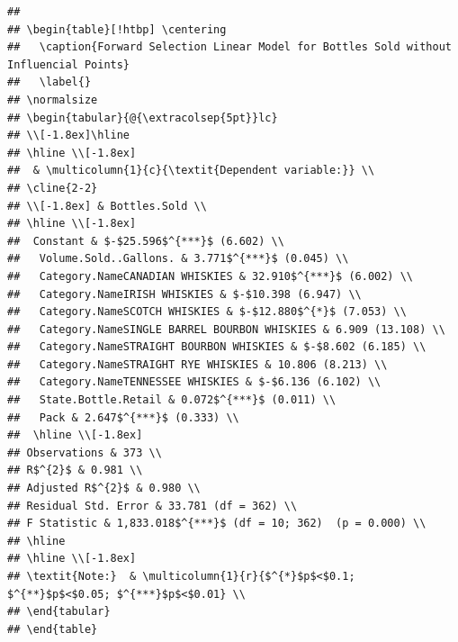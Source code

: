 \documentclass[]{elsarticle} %
\begin{document}
\begin{verbatim}
## 
## \begin{table}[!htbp] \centering 
##   \caption{Forward Selection Linear Model for Bottles Sold without Influencial Points} 
##   \label{} 
## \normalsize 
## \begin{tabular}{@{\extracolsep{5pt}}lc} 
## \\[-1.8ex]\hline 
## \hline \\[-1.8ex] 
##  & \multicolumn{1}{c}{\textit{Dependent variable:}} \\ 
## \cline{2-2} 
## \\[-1.8ex] & Bottles.Sold \\ 
## \hline \\[-1.8ex] 
##  Constant & $-$25.596$^{***}$ (6.602) \\ 
##   Volume.Sold..Gallons. & 3.771$^{***}$ (0.045) \\ 
##   Category.NameCANADIAN WHISKIES & 32.910$^{***}$ (6.002) \\ 
##   Category.NameIRISH WHISKIES & $-$10.398 (6.947) \\ 
##   Category.NameSCOTCH WHISKIES & $-$12.880$^{*}$ (7.053) \\ 
##   Category.NameSINGLE BARREL BOURBON WHISKIES & 6.909 (13.108) \\ 
##   Category.NameSTRAIGHT BOURBON WHISKIES & $-$8.602 (6.185) \\ 
##   Category.NameSTRAIGHT RYE WHISKIES & 10.806 (8.213) \\ 
##   Category.NameTENNESSEE WHISKIES & $-$6.136 (6.102) \\ 
##   State.Bottle.Retail & 0.072$^{***}$ (0.011) \\ 
##   Pack & 2.647$^{***}$ (0.333) \\ 
##  \hline \\[-1.8ex] 
## Observations & 373 \\ 
## R$^{2}$ & 0.981 \\ 
## Adjusted R$^{2}$ & 0.980 \\ 
## Residual Std. Error & 33.781 (df = 362) \\ 
## F Statistic & 1,833.018$^{***}$ (df = 10; 362)  (p = 0.000) \\ 
## \hline 
## \hline \\[-1.8ex] 
## \textit{Note:}  & \multicolumn{1}{r}{$^{*}$p$<$0.1; $^{**}$p$<$0.05; $^{***}$p$<$0.01} \\ 
## \end{tabular} 
## \end{table}
\end{verbatim}
\end{document}
